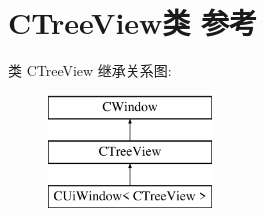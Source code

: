 \hypertarget{class_c_tree_view}{}\section{C\+Tree\+View类 参考}
\label{class_c_tree_view}
类 C\+Tree\+View 继承关系图\+:\begin{figure}[H]
\begin{center}
\leavevmode
\includegraphics[height=3.000000cm]{class_c_tree_view}
\end{center}
\end{figure}
